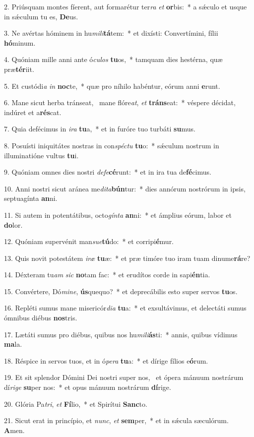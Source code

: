 2. Priúsquam montes fíerent, aut formarétur ter\textit{ra} \textit{et} \textbf{or}bis:~*  a sǽculo et usque in sǽculum tu es, \textbf{De}us.\

3. Ne avértas hóminem in hu\textit{mi}\textit{li}\textbf{tá}tem:~*  et dixísti: Convertímini, fílii \textbf{hó}minum.\

4. Quóniam mille anni ante ó\textit{cu}\textit{los} \textbf{tu}os,~*  tamquam dies hestérna, quæ præ\textbf{tér}iit.\

5. Et custódi\textit{a} \textit{in} \textbf{noc}te,~*  quæ pro níhilo habéntur, eórum anni \textbf{e}runt.\

6. Mane sicut herba tránseat, \dag\  mane flóre\textit{at}, \textit{et} \textbf{tráns}eat:~*  véspere décidat, indúret et a\textbf{rés}cat.\

7. Quia defécimus in \textit{i}\textit{ra} \textbf{tu}a,~*  et in furóre tuo turbáti \textbf{su}mus.\

8. Posuísti iniquitátes nostras in con\textit{spéc}\textit{tu} \textbf{tu}o:~*  sǽculum nostrum in illuminatióne vultus \textbf{tu}i.\

9. Quóniam omnes dies nostri \textit{de}\textit{fe}\textbf{cé}runt:~*  et in ira tua de\textbf{fé}cimus.\

10. Anni nostri sicut aránea me\textit{di}\textit{ta}\textbf{bún}tur:~*  dies annórum nostrórum in ipsis, septuagínta \textbf{an}ni.\

11. Si autem in potentátibus, octo\textit{gín}\textit{ta} \textbf{an}ni:~*  et ámplius eórum, labor et \textbf{do}lor.\

12. Quóniam supervénit man\textit{su}\textit{e}\textbf{tú}do:~*  et corripi\textbf{é}mur.\

13. Quis novit potestátem \textit{i}\textit{ræ} \textbf{tu}æ:~*  et præ timóre tuo iram tuam dinume\textbf{rá}re?\

14. Déxteram tu\textit{am} \textit{sic} \textbf{no}tam fac:~*  et erudítos corde in sapi\textbf{én}tia.\

15. Convértere, Dó\textit{mi}\textit{ne}, \textbf{ús}quequo?~*  et deprecábilis esto super servos \textbf{tu}os.\

16. Repléti sumus mane misericór\textit{di}\textit{a} \textbf{tu}a:~*  et exsultávimus, et delectáti sumus ómnibus diébus \textbf{nos}tris.\

17. Lætáti sumus pro diébus, quibus nos hu\textit{mi}\textit{li}\textbf{ás}ti:~*  annis, quibus vídimus \textbf{ma}la.\

18. Réspice in servos tuos, et in ó\textit{pe}\textit{ra} \textbf{tu}a:~*  et dírige fílios e\textbf{ó}rum.\

19. Et sit splendor Dómini Dei nostri super nos, \dag\  et ópera mánuum nostrárum dí\textit{ri}\textit{ge} \textbf{su}per nos:~*  et opus mánuum nostrárum \textbf{dí}rige.\

20. Glória Pa\textit{tri}, \textit{et} \textbf{Fí}lio,~*  et Spirítui \textbf{Sanc}to.\

21. Sicut erat in princípio, et \textit{nunc}, \textit{et} \textbf{sem}per,~*  et in sǽcula sæculórum. \textbf{A}men.\

